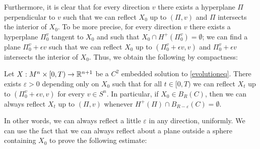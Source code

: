  Furthermore, it is clear that for every direction $v$ there exists a hyperplane $\Pi$ perpendicular to $v$ such that we can reflect $X_0$ up to $(\Pi, v)$ and $\Pi$ intersects the interior of $X_0$. To be more precise, for every direction $v$ there exists a hyperplane $\Pi_0^v$ tangent to $X_0$ and such that $X_0\cap H^+(\Pi_0^v)=\emptyset$; we can find a plane $\Pi_0^v +\epsilon v$ such that we can reflect $X_0$ up to $(\Pi_0^v +\epsilon v, v)$ and $\Pi_0^v +\epsilon v$ intersects the interior of $X_0$. Thus, we obtain the following by compactness:


\begin{cor}
	Let $X:M^n\times [0,T) \rightarrow \mathbb{R}^{n+1}$ be a $C^2$ embedded solution to \ref{evolutioneq}. There exists $\varepsilon>0$ depending only on $X_0$ such that for all $t\in[0, T)$ we can reflect $X_t$ up to $(\Pi_0^v +\epsilon v, v)$ for every $v \in S^n$. In particular, if $X_0 \in B_R (C)$, then we can always reflect $X_t$ up to $(\Pi, v)$ whenever $H^+(\Pi)\cap B_{R-\varepsilon}(C)=\emptyset$.
\end{cor}
In other words, we can always reflect a little $\varepsilon$ in any direction, uniformly. We can use the fact that we can always reflect about a plane outside a sphere containing $X_0$ to prove the following estimate:




